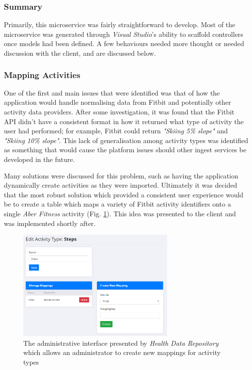 \subsubsection{Summary}
Primarily, this microservice was fairly straightforward to develop. Most of the microservice was generated through \textit{Visual Studio}'s ability to scaffold controllers once models had been defined. A few behaviours needed more thought or needed discussion with the client, and are discussed below.

\subsubsection{Mapping Activities}

One of the first and main issues that were identified was that of how the application would handle normalising data from Fitbit and potentially other activity data providers. After some investigation, it was found that the Fitbit API didn't have a consistent format in how it returned what type of activity the user had performed; for example, Fitbit could return \textit{"Skiing 5\% slope"} and \textit{"Skiing 10\% slope"}. This lack of generalisation among activity types was identified as something that would cause the platform issues should other ingest services be developed in the future. 

Many solutions were discussed for this problem, such as having the application dynamically create activities as they were imported. Ultimately it was decided that the most robust solution which provided a consistent user experience would be to create a table which maps a variety of Fitbit activity identifiers onto a single \textit{Aber Fitness} activity (Fig. \ref{fig:health_mappings}). This idea was presented to the client and was implemented shortly after.

\begin{figure}[H]
    \centering
    \includegraphics[width=0.7\textwidth]{Images/Chpt5_HealthData_Mapping.png}
    \caption{The administrative interface presented by \textit{Health Data Repository} which allows an administrator to create new mappings for activity types}
    \label{fig:health_mappings}
\end{figure}

